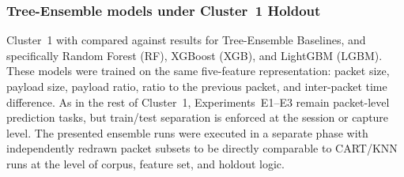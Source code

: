 \documentclass[conference]{IEEEtran}
\begin{document}
\subsubsection{Tree-Ensemble models under Cluster~1 Holdout}
\label{subsec:strict-ensembles}

Cluster~1 with compared against results for Tree-Ensemble Baselines, and specifically Random Forest (RF), XGBoost (XGB), and LightGBM (LGBM). These models were trained on the same five-feature representation: packet size, payload size, payload ratio, ratio to the previous packet, and inter-packet time difference. As in the rest of Cluster~1, Experiments~E1--E3 remain packet-level prediction tasks, but train/test separation is enforced at the session or capture level. The presented ensemble runs were executed in a separate phase with independently redrawn packet subsets to be directly comparable to CART/KNN runs at the level of corpus, feature set, and holdout logic.

\begin{table}[t]
\centering
\caption{Cluster~1 tree-ensemble results. Cell reports accuracy with malicious-class $F_1$ in parentheses. E1 and E2 are mixed-traffic packet tasks under grouped holdout, E3 is encrypted-only, and LOFO columns report macro-averages over five held-out malware families.}
\label{tab:strict-tree-ensembles}
\footnotesize
{}
\end{table}
\end{document}

